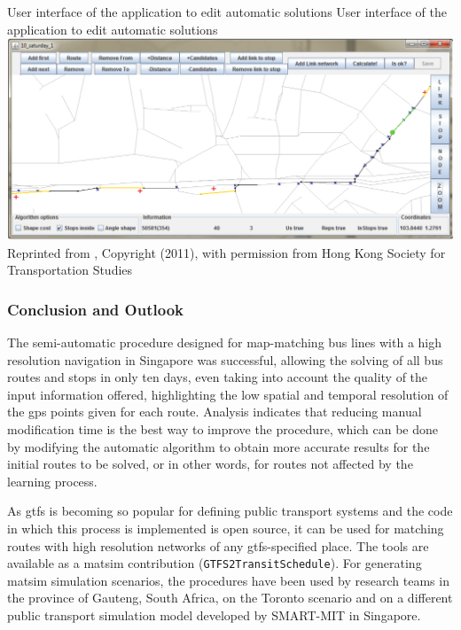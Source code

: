 \createfigure
{User interface of the application to edit automatic solutions}
{User interface of the application to edit automatic solutions}
{\label{fig:Application}}
{\includegraphics[width=1.0\textwidth]{extending/figures/semiAuto/Application.png}}
{Reprinted from \citet[][p.757]{Ordonez_HKSTS_2011}, Copyright (2011), with permission from Hong Kong Society for Transportation Studies}

\subsubsection{Conclusion and Outlook}
The semi-automatic procedure designed for map-matching bus lines with a high resolution navigation in Singapore was successful, allowing the solving of all bus routes and stops in only ten days, even taking into account the quality of the input information offered, highlighting the low spatial and temporal resolution of the \gls{gps} points given for each route. Analysis indicates that reducing manual modification time is the best way to improve the procedure, which can be done by modifying the automatic algorithm to obtain more accurate results for the initial routes to be solved, or in other words, for routes not affected by the learning process.

As \gls{gtfs} is becoming so popular for defining public transport systems and the code in which this process is implemented is open source, it can be used for matching routes with high resolution networks of any \gls{gtfs}-specified place. The tools are available as a \gls{matsim} \gls{contribution} (\lstinline|GTFS2TransitSchedule|). For generating \gls{matsim} simulation scenarios, the procedures have been used by research teams in the province of Gauteng, South Africa, on the Toronto scenario and on a different public transport simulation model developed by SMART-MIT in Singapore.

